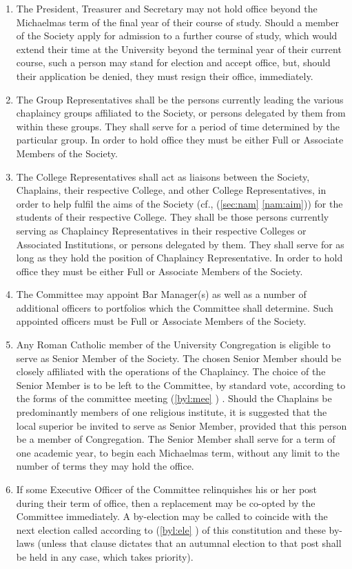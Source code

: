 \documentclass[11pt]{article}
\begin{document}
\begin{enumerate}
\item The President, Treasurer and Secretary may not hold office beyond the Michaelmas term of the final year of their course of study. Should a member of the Society apply for admission to a further course of study, which would extend their time at the University beyond the terminal year of their current course, such a person may stand for election and accept office, but, should their application be denied, they must resign their office, immediately.
\item The Group Representatives shall be the persons currently leading the various chaplaincy groups affiliated to the Society, or persons delegated by them from within these groups. They shall serve for a period of time determined by the particular group. In order to hold office they must be either Full or Associate Members of the Society.
\item The College Representatives shall act as liaisons between the Society, Chaplains, their respective College, and other College Representatives, in order to help fulfil the aims of the Society (cf.,  (\cref{sec:nam} \cref{nam:aim})) for the students of their respective College. They shall be those persons currently serving as Chaplaincy Representatives in their respective Colleges or Associated Institutions, or persons delegated by them. They shall serve for as long as they hold the position of Chaplaincy Representative. In order to hold office they must be either Full or Associate Members of the Society.
\item The Committee may appoint Bar Manager(s) as well as a number of additional officers to portfolios which the Committee shall determine. Such appointed officers must be Full or Associate Members of the Society.
\item Any Roman Catholic member of the University Congregation is eligible to serve as Senior Member of the Society. The chosen Senior Member should be closely affiliated with the operations of the Chaplaincy. The choice of the Senior Member is to be left to the Committee, by standard vote, according to the forms of the committee meeting (\cref{byl:mee} ) . Should the Chaplains be predominantly members of one religious institute, it is suggested that the local superior be invited to serve as Senior Member, provided that this person be a member of Congregation. The Senior Member shall serve for a term of one academic year, to begin each Michaelmas term, without any limit to the number of terms they may hold the office.
\item If some Executive Officer of the Committee relinquishes his or her post during their term of office, then a replacement may be co-opted by the Committee immediately. A by-election may be called to coincide with the next election called according to  (\cref{byl:ele} ) of this constitution and these by-laws (unless that clause dictates that an autumnal election to that post shall be held in any case, which takes priority).


\end{enumerate}
\end{document}
